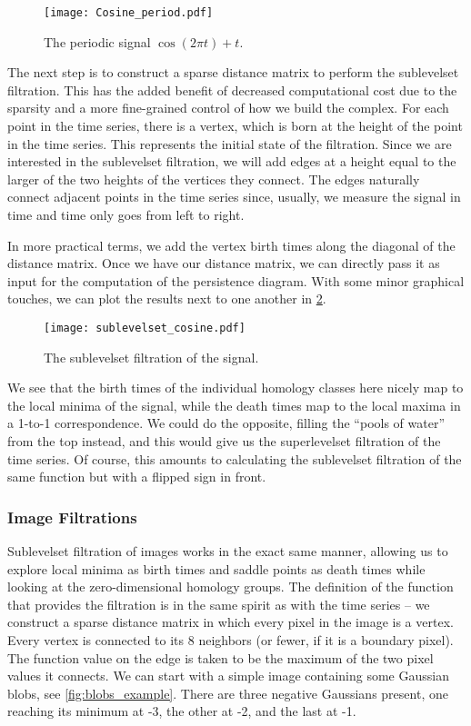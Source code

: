 \begin{figure}[h!]
  \centering
  \texttt{[image: Cosine\_period.pdf]}
  \caption{The periodic signal $\cos(2\pi t) + t$.}
  \label{fig:cosine_period}
\end{figure}

The next step is to construct a sparse distance matrix to perform the sublevelset filtration. This has the added benefit of decreased computational cost due to the sparsity and a more fine-grained control of how we build the complex. For each point in the time series, there is a vertex, which is born at the height of the point in the time series. This represents the initial state of the filtration. Since we are interested in the sublevelset filtration, we will add edges at a height equal to the larger of the two heights of the vertices they connect. The edges naturally connect adjacent points in the time series since, usually, we measure the signal in time and time only goes from left to right.

In more practical terms, we add the vertex birth times along the diagonal of the distance matrix. Once we have our distance matrix, we can directly pass it as input for the computation of the persistence diagram. With some minor graphical touches, we can plot the results next to one another in \ref{fig:cosine_filtration}.

\begin{figure}[h!]
  \centering
  \texttt{[image: sublevelset\_cosine.pdf]}
  \caption{The sublevelset filtration of the signal.}
  \label{fig:cosine_filtration}
\end{figure}

We see that the birth times of the individual homology classes here nicely map to the local minima of the signal, while the death times map to the local maxima in a 1-to-1 correspondence. We could do the opposite, filling the ``pools of water'' from the top instead, and this would give us the superlevelset filtration of the time series. Of course, this amounts to calculating the sublevelset filtration of the same function but with a flipped sign in front.

\subsubsection{Image Filtrations}

Sublevelset filtration of images works in the exact same manner, allowing us to explore local minima as birth times and saddle points as death times while looking at the zero-dimensional homology groups. The definition of the function that provides the filtration is in the same spirit as with the time series -- we construct a sparse distance matrix in which every pixel in the image is a vertex. Every vertex is connected to its 8 neighbors (or fewer, if it is a boundary pixel). The function value on the edge is taken to be the maximum of the two pixel values it connects. We can start with a simple image containing some Gaussian blobs, see \ref{fig:blobs_example}. There are three negative Gaussians present, one reaching its minimum at -3, the other at -2, and the last at -1.

